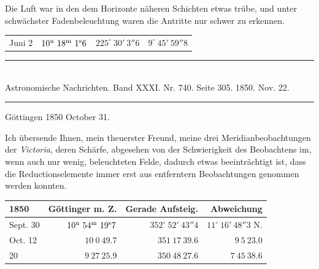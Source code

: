 Die Luft war in den dem Horizonte näheren Schichten etwas trübe, und unter schwächster Fadenbeleuchtung waren die Antritte nur schwer zu erkennen.

\begin{center}
\setlength{\tabcolsep}{4pt}
\begin{tabular}{l|r|r|r}
Juni 2 & $10^{\rm u}\ 18^{\rm m}\ 1^{\rm s}6$ & $225^\circ\ 30'\ 3''6$ & $9^\circ\ 45'\ 59''8$ \\
\end{tabular}
\end{center}

\clearpage
\hypertarget{native-483-victoria}{}
\begin{center}
\rule{0.55\linewidth}{0.4pt}\\[2pt]
Astronomische Nachrichten. Band XXXI. Nr. 740. Seite 305. 1850. Nov. 22.\\[2pt]
\rule{0.55\linewidth}{0.4pt}
\end{center}
\begin{flushright}Göttingen 1850 October 31.\end{flushright}

Ich übersende Ihnen, mein theuerster Freund, meine drei Meridianbeobachtungen der \emph{Victoria}, deren Schärfe, abgesehen von der Schwierigkeit des Beobachtens im, wenn auch nur wenig, beleuchteten Felde, dadurch etwas beeinträchtigt ist, dass die Reductionselemente immer erst aus entferntern Beobachtungen genommen werden konnten.

\begin{center}
\setlength{\tabcolsep}{3pt}
\begin{tabular}{l|r|r|r}
1850 & Göttinger m. Z. & Gerade Aufsteig. & Abweichung \\\hline
Sept. 30 & $10^{\rm u}\ 54^{\rm m}\ 19^{\rm s}7$ & $352^\circ\ 52'\ 43''4$ & $11^\circ\ 16'\ 48''3$ N. \\
Oct. 12 & $10\ 0\ 49.7$ & $351\ 17\ 39.6$ & $9\ 5\ 23.0$ \\
\hfill 20 & $9\ 27\ 25.9$ & $350\ 48\ 27.6$ & $7\ 45\ 38.6$ \\
\end{tabular}
\end{center}
